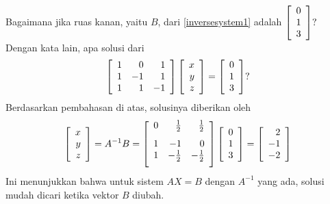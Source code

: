 Bagaimana jika ruas kanan, yaitu $B$, dari \ref{inversesystem1} adalah $\left[
\begin{array}{r}
0 \\
1 \\
3
\end{array}
\right] ?$ Dengan kata lain, apa solusi dari
\begin{equation*}
\left[
\begin{array}{rrr}
1 & 0 & 1 \\
1 & -1 & 1 \\
1 & 1 & -1
\end{array}
\right] \left[
\begin{array}{r}
x \\
y \\
z
\end{array}
\right] =\left[
\begin{array}{r}
0 \\
1 \\
3
\end{array}
\right] ?
\end{equation*}
Berdasarkan pembahasan di atas, solusinya diberikan oleh
\begin{equation*}
\leftB
\begin{array}{r}
x \\
y \\
z
\end{array}
\rightB = A^{-1}B = \leftB
\begin{array}{rrr}
0 & \vspace{0.05in}\frac{1}{2} & \vspace{0.05in}\frac{1}{2} \\
1 & -1 & 0 \\
1 & -\vspace{0.05in}\frac{1}{2} & -\vspace{0.05in}\frac{1}{2}
\end{array}
\rightB \leftB
\begin{array}{r}
0 \\
1 \\
3
\end{array}
\rightB =\leftB
\begin{array}{r}
2 \\
-1 \\
-2
\end{array}
\rightB 
\end{equation*}
Ini menunjukkan bahwa untuk sistem $AX=B$ dengan $A^{-1}$ yang ada,
solusi mudah dicari ketika vektor $B$ diubah.
%
